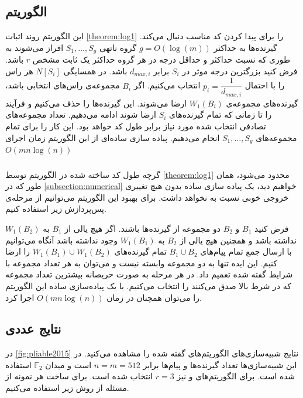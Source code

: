 \subsection{الگوریتم }
این الگوریتم روند اثبات
\autoref{theorem:log1}
را برای پیدا کردن کد مناسب دنبال می‌کند. گیرنده‌ها به حداکثر
$g = O(\log(m))$
گروه ناتهی
$S_1, \ldots, S_g$
افراز می‌شوند به طوری که نسبت حداکثر و حداقل درجه در هر گروه حداکثر یک ثابت مشخص
$r$
باشد. فرض کنید بزرگترین درجه موثر در
$S_i$
برابر
$d_{max, i}$
باشد. در همسایگی
$N[S_i]$
هر راس را با احتمال
$p_i = \dfrac{1}{d_{max, i}}$
انتخاب می‌کنیم. اگر
$B_i$
مجموعه‌ی راس‌های انتخابی باشد، گیرنده‌های مجموعه‌ی
$W_1(B_i)$
ارضا می‌شوند. این گیرنده‌ها را حذف می‌کنیم و فرآیند را تا زمانی که تمام گیرنده‌های
$S_i$
ارضا شوند ادامه می‌دهیم. تعداد مجموعه‌های تصادفی انتخاب شده مورد نیاز برابر طول کد خواهد بود. این کار را برای تمام مجموعه‌های
$S_1, \ldots, S_g$
انجام می‌دهیم. پیاده سازی ساده‌ای از این الگوریتم زمان اجرای
$O(m n \log(n))$

\subsubsection{}
گرچه طول کد ساخته شده در الگوریتم
توسط
\autoref{theorem:log1}
محدود می‌شود، همان طور که در
\autoref{subsection:numerical}
خواهیم دید، یک پیاده سازی ساده بدون هیچ تغییری خروجی خوبی نسبت به
نخواهد داشت. برای بهبود این الگوریتم می‌توانیم از مرحله‌ی پس‌پردازش زیر استفاده کنیم.

فرض کنید
$B_1$
و
$B_2$
دو مجموعه از گیرنده‌ها باشند. اگر هیچ یالی از
$B_1$
به
$W_1(B_2)$
نداشته باشد و همچنین هیچ یالی از
$B_2$
به
$W_1(B_1)$
وجود نداشته باشد آنگاه می‌توانیم با ارسال جمع تمام پیام‌های
$B_1 \cup B_2$
تمام گیرنده‌های
$W_1(B_1) \cup W_1(B_2)$
را ارضا کنیم. این ایده تنها به دو مجموعه وابسته نیست و می‌توان به هر تعداد مجموعه با شرایط گفته شده تعمیم داد. در هر مرحله به صورت حریصانه بیشترین تعداد مجموعه که در شرط بالا صدق می‌کنند را انتخاب می‌کنیم. با یک پیاده‌سازی ساده این الگوریتم را می‌توان همچنان در زمان
$O(m n \log(n))$
اجرا کرد.
\subsection{
    نتایج عددی
}
\label{subsection:numerical}
در
\autoref{fig:pliable2015}
نتایج شبیه‌سازی‌های الگوریتم‌های گفته شده را مشاهده می‌کنید. در این شبیه‌سازی‌ها تعداد گیرنده‌ها و پیام‌ها برابر
$n = m = 512$
است و میدان
$\mathbb{F}_2$
استفاده شده است. برای الگوریتم‌های
و
نیز
$r = 3$
انتخاب شده است. برای ساخت هر نمونه از مسئله از روش زیر استفاده می‌کنیم.

